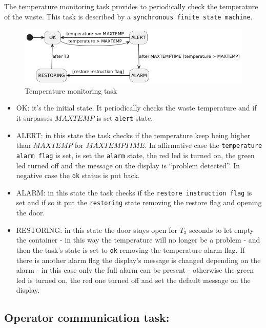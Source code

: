 \documentclass[a4paper,12pt]{report}
\begin{document}
            The temperature monitoring task provides to periodically check the temperature of the waste.
            This task is described by a \texttt{synchronous finite state machine}. 

            \begin{figure}[H]
        	\centering{}
                \includegraphics[width=\textwidth]{img/temperature_task.png}
        	\caption{Temperature monitoring task}
        	\label{img:temperature_task}
            \end{figure}

            \begin{itemize}
                \item OK: it's the initial state. It periodically checks the waste temperature and if it surpasses $MAXTEMP$ is set \texttt{alert} state. 
                \item ALERT: in this state the task checks if the temperature keep being higher than $MAXTEMP$ for $MAXTEMPTIME$. In affirmative case the \texttt{temperature alarm flag} is set, is set the \texttt{alarm} state, the red led is turned on, the green led turned off and the message on the display is ``problem detected''. In negative case the \texttt{ok} status is put back.
                \item ALARM: in this state the task checks if the \texttt{restore instruction flag} is set and if so it put the \texttt{restoring} state removing the restore flag and opening the door.
                \item RESTORING: in this state the door stays open for $T_3$ seconds to let empty the container - in this way the temperature will no longer be a problem - and then the task's state is set to \texttt{ok} removing the temperature alarm flag. If there is another alarm flag the display's message is changed depending on the alarm - in this case only the full alarm can be present - otherwise the green led is turned on, the red one turned off and set the default message on the display.
            \end{itemize}

        \subsection{Operator communication task:}
\end{document}

